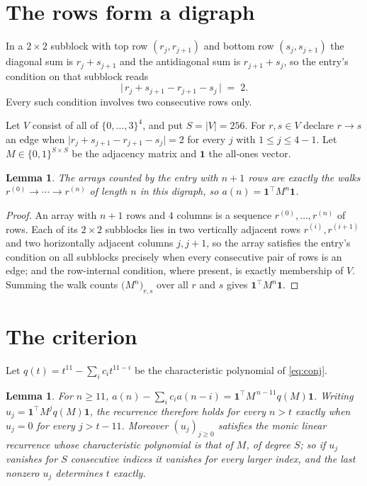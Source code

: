\documentclass[11pt,a4paper]{article}
\theoremstyle{plain}
\newtheorem{lemma}[theorem]{Lemma}
\theoremstyle{definition}
\begin{document}
\section{The rows form a digraph}

In a $2\times2$ subblock with top row $(r_j,r_{j+1})$ and bottom row $(s_j,s_{j+1})$ the
diagonal sum is $r_j+s_{j+1}$ and the antidiagonal sum is $r_{j+1}+s_j$, so the entry's
condition on that subblock reads
\[
\bigl|\,r_j+s_{j+1}-r_{j+1}-s_j\,\bigr|\;=\;2.
\]
Every such condition involves two consecutive rows only.

Let $V$ consist of all of $\{0,\dots,3\}^{4}$, and put $S=|V|=256$. For $r,s\in V$ declare $r\to s$ an edge
when $\bigl|r_j+s_{j+1}-r_{j+1}-s_j\bigr|=2$ for every $j$ with
$1\le j\le4-1$. Let $M\in\{0,1\}^{S\times S}$ be the adjacency matrix and $\mathbf{1}$
the all-ones vector.

\begin{lemma}\label{lem:walk}
The arrays counted by the entry with $n+1$ rows are exactly the walks
$r^{(0)}\to\cdots\to r^{(n)}$ of length $n$ in this digraph, so
$a(n)=\mathbf{1}^{\!\top}M^{n}\mathbf{1}$.
\end{lemma}

\begin{proof}
An array with $n+1$ rows and $4$ columns is a sequence $r^{(0)},\dots,r^{(n)}$ of
rows. Each of its $2\times2$ subblocks lies in two vertically adjacent rows
$r^{(i)},r^{(i+1)}$ and two horizontally adjacent columns $j,j+1$, so the array satisfies
the entry's condition on all subblocks precisely when every consecutive pair of rows is an
edge; and the row-internal condition, where present, is exactly membership of $V$. Summing
the walk counts $\bigl(M^{n}\bigr)_{r,s}$ over all $r$ and $s$ gives
$\mathbf{1}^{\!\top}M^{n}\mathbf{1}$.
\end{proof}

\section{The criterion}

Let $q(t)=t^{11}-\sum_i c_i t^{11-i}$ be the characteristic polynomial of
\eqref{eq:conj}.

\begin{lemma}\label{lem:crit}
For $n\ge11$,
$a(n)-\sum_i c_i a(n-i)=\mathbf{1}^{\!\top}M^{\,n-11}q(M)\mathbf{1}$. Writing
$u_j=\mathbf{1}^{\!\top}M^{j}q(M)\mathbf{1}$, the recurrence therefore holds for every
$n>t$ exactly when $u_j=0$ for every $j>t-11$. Moreover $(u_j)_{j\ge0}$ satisfies the
monic linear recurrence whose characteristic polynomial is that of $M$, of degree $S$; so
if $u_j$ vanishes for $S$ consecutive indices it vanishes for every larger index, and the
last nonzero $u_j$ determines $t$ exactly.
\end{lemma}
\end{document}
